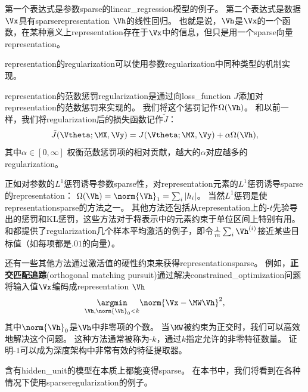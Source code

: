 
第一个表达式是参数\gls{sparse}的\gls{linear_regression}模型的例子。
第二个表达式是数据$\Vx$具有\gls{sparse}\gls{representation} $\Vh$的线性回归。
也就是说，$\Vh$是$\Vx$的一个函数，在某种意义上\gls{representation}存在于$\Vx$中的信息，但只是用一个\gls{sparse}向量\gls{representation}。

\gls{representation}的\gls{regularization}可以使用参数\gls{regularization}中同种类型的机制实现。

\gls{representation}的范数惩罚\gls{regularization}是通过向\gls{loss_function} $J$添加对\gls{representation}的范数惩罚来实现的。
我们将这个惩罚记作$\Omega(\Vh)$。
和以前一样，我们将\gls{regularization}后的损失函数记作$\tilde J$：
\begin{align}
 \tilde J(\Vtheta; \MX, \Vy) =  J(\Vtheta; \MX, \Vy)  + \alpha \Omega(\Vh),
\end{align}
其中$\alpha \in [0, \infty]$ 权衡范数惩罚项的相对贡献，越大的$\alpha$对应越多的\gls{regularization}。

正如对参数的$L^1$惩罚诱导参数\gls{sparse}性，对\gls{representation}元素的$L^1$惩罚诱导\gls{sparse}的\gls{representation}：
$\Omega(\Vh) = \norm{\Vh}_1 = \sum_i |h_i|$。
当然$L^1$惩罚是使\gls{representation}\gls{sparse}的方法之一。
其他方法还包括从\gls{representation}上的-$t$先验导出的惩罚\citep{Olshausen-Field-1996,Bergstra-2011}和\gls{KL}惩罚\citep{Larochelle-Bengio-2008}，这些方法对于将表示中的元素约束于单位区间上特别有用。
\cite{Lee-et-al-2008}和\cite{Goodfellow-et-al-2009}都提供了\gls{regularization}几个样本平均激活的例子，即令$\frac{1}{m}\sum_i \Vh^{(i)}$接近某些目标值（如每项都是$.01$的向量）。

还有一些其他方法通过激活值的硬性约束来获得\gls{representation}\gls{sparse}。
例如，\textbf{正交匹配追踪}(orthogonal matching pursuit)\citep{Pati-et-al-1993}通过解决\gls{constrained_optimization}问题将输入值$\Vx$编码成\gls{representation} $\Vh$
\begin{align}
 \underset{\Vh, \norm{\Vh}_0 < k}{\argmin} \norm{\Vx - \MW \Vh}^2,
\end{align}
其中$\norm{\Vh}_0 $是$\Vh$中非零项的个数。
当$\MW$被约束为正交时，我们可以高效地解决这个问题。
这种方法通常被称为-$k$，通过$k$指定允许的非零特征数量。
\cite{Coates-Ng-2011}证明-$1$可以成为深度架构中非常有效的特征提取器。


含有\gls{hidden_unit}的模型在本质上都能变得\gls{sparse}。
在本书中，我们将看到在各种情况下使用\gls{sparse}\gls{regularization}的例子。

